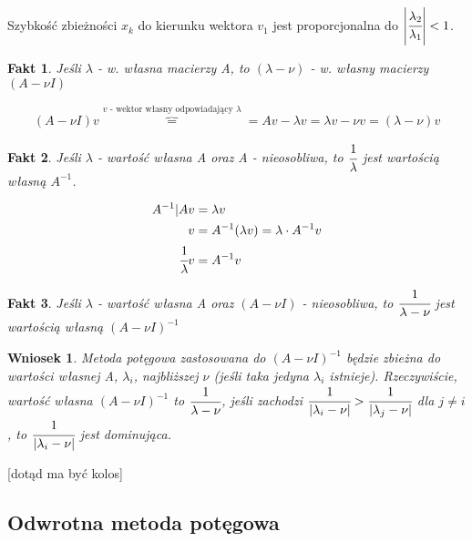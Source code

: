 \documentclass[hidelinks,a4paper]{article}
\newcommand{\RR}{\mathbb{R}}
\newcommand{\CC}{\mathbb{C}}
\newtheorem{wniosek}{Wniosek}
\newtheorem{fakt}{Fakt}
\begin{document}
Szybkość zbieżności $x_k$ do kierunku wektora $v_1$ jest proporcjonalna do $\left| \cfrac{\lambda_2}{\lambda_1} \right| < 1$.
 
%


\begin{fakt}
	Jeśli $\lambda$ - w. własna macierzy A, to $(\lambda - \nu)$ - w. własny macierzy $(A - \nu I)$
	 
	\[
		(A - \nu I)v \overbrace{=}^{v\textrm{ - wektor własny odpowiadający }\lambda} = Av - \lambda v = \lambda v - \nu v = (\lambda - \nu)v
	\]
\end{fakt} 

\begin{fakt} Jeśli $\lambda$ - wartość własna A oraz A - nieosobliwa, to $\cfrac{1}{\lambda}$ jest wartością własną $A^{-1}$.
	
	\begin{equation}
		\begin{aligned}
			A^{-1}| Av           & = \lambda v                                  \\
			v                    & = A^{-1}(\lambda v) = \lambda \cdot A^{-1} v \\
			\cfrac{1}{\lambda} v & = A^{-1}v                                    
		\end{aligned}
	\end{equation}
	
\end{fakt}

\begin{fakt} Jeśli $\lambda$ - wartość własna A oraz $(A - \nu I)$ - nieosobliwa, to $\cfrac{1}{\lambda - \nu}$ jest wartością własną $(A - \nu I)^{-1}$
\end{fakt}

\begin{wniosek} Metoda potęgowa zastosowana do $(A - \nu I)^{-1}$ będzie zbieżna do wartości własnej A, $\lambda_i$, najbliższej $\nu$ (jeśli taka jedyna $\lambda_i$ istnieje). Rzeczywiście, wartość własna $(A - \nu I)^{-1}$ to $\cfrac{1}{\lambda - \nu}$, jeśli zachodzi $\cfrac{1}{|\lambda_i - \nu|} > \cfrac{1}{|\lambda_j - \nu|}$ dla $j \neq i$, to $\cfrac{1}{|\lambda_i - \nu|}$ jest dominująca.
\end{wniosek}

[dotąd ma być kolos]

\subsection{Odwrotna metoda potęgowa}
\end{document}
